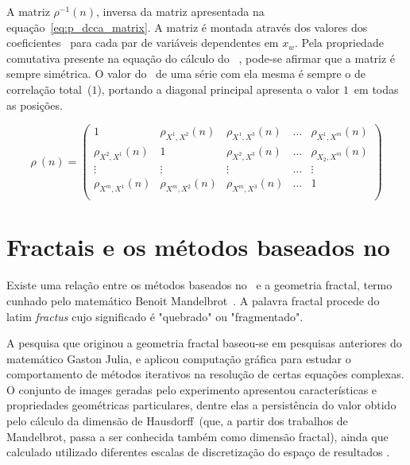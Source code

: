A matriz  $\rho^{-1}(n)$, inversa da matriz apresentada na equação~\ref{eq:p_dcca_matrix}. A matriz é montada através dos valores dos coeficientes \pdcca~para cada par de variáveis dependentes em $x_{w}$. Pela propriedade comutativa presente na equação do cálculo do \pdcca~, pode-se afirmar que a matriz é sempre simétrica. O valor do \pdcca~de uma série com ela mesma é sempre o de correlação total~($1$), portando a diagonal principal apresenta o valor $1$~em todas as posições.

\begin{equation}
  \rho~(n) = \left(\begin{matrix}
    1                     & \rho_{X^{1},X^{2}}(n) & \rho_{X^{1},X^{3}}(n) & \dots & \rho_{X^{1},X^{m}}(n) \\
    \rho_{X^{2},X^{1}}(n) & 1                     & \rho_{X^{2},X^{3}}(n) & \dots & \rho_{X_{2},X^{m}}(n) \\
    \vdots                & \vdots                & \vdots                & \dots & \vdots                \\
    \rho_{X^{m},X^{1}}(n) & \rho_{X^{m},X^{2}}(n) & \rho_{X^{m},X^{3}}(n) & \dots & 1                     \\
  \end{matrix}\right)
  \label{eq:p_dcca_matrix}
\end{equation}

\section{Fractais e os métodos baseados no \dfa}
\label{ss:dfa_fract}

Existe uma relação entre os métodos baseados no \dfa~e a geometria fractal, termo cunhado pelo matemático Benoit Mandelbrot~\cite{mandelbrot1977fractals}. A palavra fractal procede do latim \textit{fractus} cujo significado é "quebrado" ou "fragmentado".

A pesquisa que originou a geometria fractal baseou-se em pesquisas anteriores do matemático Gaston Julia, e aplicou computação gráfica para estudar o comportamento de métodos iterativos na resolução de certas equações complexas. O conjunto de images geradas pelo experimento apresentou características e propriedades geométricas particulares, dentre elas a persistência do valor obtido pelo cálculo da dimensão de Hausdorff~(que, a partir dos trabalhos de Mandelbrot, passa a ser conhecida também como dimensão fractal), ainda que calculado utilizado diferentes escalas de discretização do espaço de resultados \cite{mandelbrot1983fractal}.

